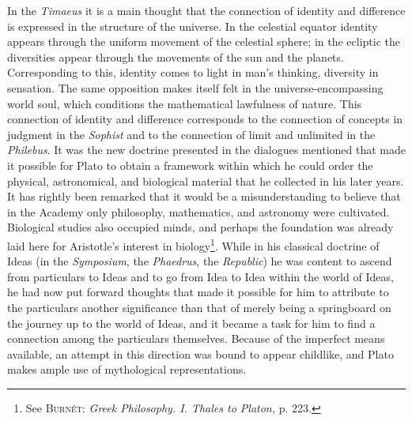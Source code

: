 \documentclass[12pt,a4paper,openany]{book}
\newcommand{\opage}[1]{\marginnote{\footnotesize\textit{[#1]}}}
\begin{document}
In the \textit{Timaeus} it is a main thought that the connection of
identity and difference is expressed in the structure of the universe.  In
the celestial equator identity appears through the uniform movement
of the celestial sphere; in the ecliptic the diversities appear
through the movements of the sun and the planets.
Corresponding to this, identity comes to light in man's
thinking, diversity in sensation.  The same
opposition makes itself felt in the universe-encompassing
\setcounter{footnote}{0}%
\opage{62}world soul, which conditions the mathematical lawfulness of nature.
This connection of identity and difference corresponds to
the connection of concepts in judgment in the \textit{Sophist} and to the
connection of limit and unlimited in the \textit{Philebus}.  It was the
new doctrine presented in the dialogues mentioned that made it
possible for Plato to obtain a framework within which he
could order the physical, astronomical, and biological material
that he collected in his later years.  It has rightly been remarked
that it would be a misunderstanding to believe that in
the Academy only philosophy, mathematics, and astronomy were cultivated.
Biological studies also occupied minds, and perhaps
the foundation was already laid here for Aristotle's interest in
biology\footnote[1]{See \textsc{Burnét}: \textit{Greek Philosophy. I. Thales to Platon,} p. 223.}. %
While in his classical doctrine of Ideas (in the \textit{Symposium},
the \textit{Phaedrus}, the \textit{Republic}) he was content to ascend
from particulars to Ideas and to go from Idea to Idea within the
world of Ideas, he had now put forward thoughts that made it
possible for him to attribute to the particulars another significance than
that of merely being a springboard on the journey up to the world of Ideas,
and it became a task for him to find a connection
among the particulars themselves.  Because of the imperfect
means available, an attempt in this direction
was bound to appear childlike, and Plato makes ample
use of mythological representations.
\end{document}
